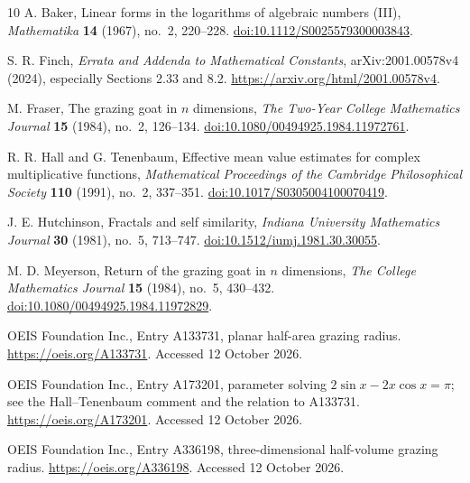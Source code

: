 \documentclass[11pt,a4paper]{article}
\numberwithin{equation}{section}
\theoremstyle{definition}
\theoremstyle{remark}
\begin{document}
\begin{thebibliography}{10}
A. Baker, Linear forms in the logarithms of algebraic numbers (III),
\emph{Mathematika} \textbf{14} (1967), no.~2, 220--228.
\href{https://doi.org/10.1112/S0025579300003843}{doi:10.1112/S0025579300003843}.

S. R. Finch, \emph{Errata and Addenda to Mathematical Constants},
arXiv:2001.00578v4 (2024), especially Sections 2.33 and 8.2.
\url{https://arxiv.org/html/2001.00578v4}.

M. Fraser, The grazing goat in $n$ dimensions,
\emph{The Two-Year College Mathematics Journal} \textbf{15} (1984), no.~2, 126--134.
\href{https://doi.org/10.1080/00494925.1984.11972761}{doi:10.1080/00494925.1984.11972761}.

R. R. Hall and G. Tenenbaum, Effective mean value estimates for complex multiplicative functions,
\emph{Mathematical Proceedings of the Cambridge Philosophical Society}
\textbf{110} (1991), no.~2, 337--351.
\href{https://doi.org/10.1017/S0305004100070419}{doi:10.1017/S0305004100070419}.

J. E. Hutchinson, Fractals and self similarity,
\emph{Indiana University Mathematics Journal} \textbf{30} (1981), no.~5, 713--747.
\href{https://doi.org/10.1512/iumj.1981.30.30055}{doi:10.1512/iumj.1981.30.30055}.

M. D. Meyerson, Return of the grazing goat in $n$ dimensions,
\emph{The College Mathematics Journal} \textbf{15} (1984), no.~5, 430--432.
\href{https://doi.org/10.1080/00494925.1984.11972829}{doi:10.1080/00494925.1984.11972829}.

OEIS Foundation Inc., Entry A133731, planar half-area grazing radius.
\url{https://oeis.org/A133731}. Accessed 12 October 2026.

OEIS Foundation Inc., Entry A173201, parameter solving
$2\sin x-2x\cos x=\pi$; see the Hall--Tenenbaum comment and the relation to A133731.
\url{https://oeis.org/A173201}. Accessed 12 October 2026.

OEIS Foundation Inc., Entry A336198, three-dimensional half-volume grazing radius.
\url{https://oeis.org/A336198}. Accessed 12 October 2026.
\end{thebibliography}
\end{document}
